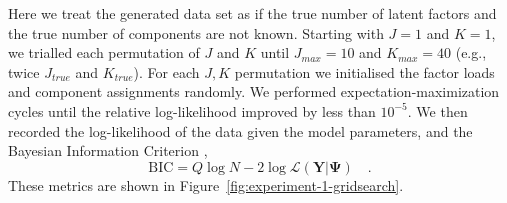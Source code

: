 \documentclass[twocolumn]{aastex61}
\newcommand{\vect}[1]{\boldsymbol{\mathbf{#1}}}
\renewcommand{\vec}[1]{\vect{#1}}
\newcommand{\data}{\textbf{Y}}
\newcommand{\NumLatentFactors}{J}
\newcommand{\NumComponents}{K}
\begin{document}
Here we treat the generated data set as if the true number of latent factors
and the true number of components are not known. Starting with $\NumLatentFactors = 1$
and $\NumComponents = 1$, we trialled each permutation of $\NumLatentFactors$ and $\NumComponents$
until $\NumLatentFactors_{max} = 10$
and   $\NumComponents_{max} = 40$ (e.g., twice $\NumLatentFactors_{true}$ and $\NumComponents_{true}$).
For each $\NumLatentFactors,\NumComponents$ permutation we initialised the factor
loads and component assignments randomly. We performed expectation-maximization 
cycles until the relative log-likelihood improved by less than $10^{-5}$. We then
recorded the log-likelihood of the data given the model parameters, and the
Bayesian Information Criterion \citep{bic}, 
\begin{equation}
	\textrm{BIC} = Q\log{N} - 2\log\mathcal{L}\left(\data|\vec\Psi\right) \quad . \label{eq:bic}
\end{equation} 
These metrics are shown in Figure~\ref{fig:experiment-1-gridsearch}.
\end{document}
